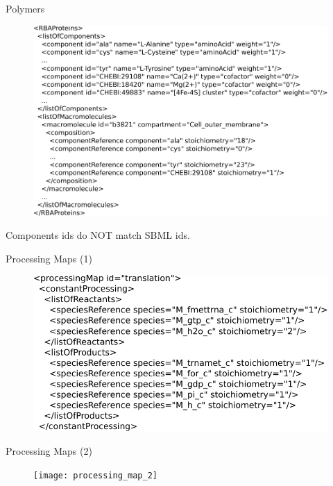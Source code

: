 \documentclass{beamer}
\begin{document}
\begin{frame}{Polymers}
  \begin{figure}
    \centering
    \includegraphics[width=\linewidth]{polymers}
  \end{figure}
  Components ids do NOT match SBML ids.
\end{frame}

\begin{frame}{Processing Maps (1)}
  \begin{figure}
    \includegraphics[scale=0.7]{processing_map}
  \end{figure}
\end{frame}

\begin{frame}{Processing Maps (2)}
  \begin{figure}
    \texttt{[image: processing\_map\_2]}
  \end{figure}
\end{frame}
\end{document}
